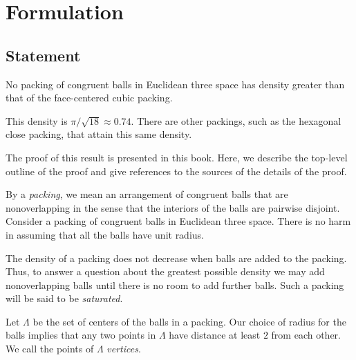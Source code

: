 



\chapter{Formulation}

\section{Statement}



\begin{theorem}
\label{theorem:kepler}   No packing of congruent balls in
Euclidean three space has density greater than that of the
face-centered cubic packing.
\end{theorem}

\begin{remark}
This density is $\pi/\sqrt{18}\approx 0.74.$  There are other
packings, such as the hexagonal close packing, that attain this
same density.
\end{remark}

The proof of this result is presented in this book. Here, we
describe the top-level outline of the proof and give references to
the sources of the details of the proof.

By a {\it packing}, we mean an arrangement of congruent balls that
are nonoverlapping in the sense that the interiors of the balls are
pairwise disjoint. Consider a  packing of congruent
balls in Euclidean three space. There is no harm in assuming that
all the balls have unit radius. 

The density of a packing does not
decrease when balls are added to the packing. Thus, to answer a
question about the greatest possible density we may add
nonoverlapping balls until there is no room to add further balls.
Such a packing will be said to be {\it saturated}.


Let $\Lambda$ be the set of centers of the balls in a
packing. Our choice of radius for the
balls implies that any two points in $\Lambda$ have distance at
least $2$ from each other. We call the points of $\Lambda$ {\it
{} vertices}.


